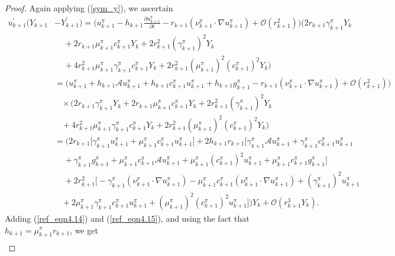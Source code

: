 \documentclass[10pt,a4paper]{amsart}
\begin{document}
\begin{proof}
Again applying (\ref{sym_y}), we ascertain
\begin{align}
u_{k+1}^{'}(Y_{k+1} &- Y_{k+1}^{'}) = \Big(u_{k+1}^{\pi} - h_{k+1}\frac{\partial u_{k+1}^{\pi}}{\partial t} - r_{k+1}(\nu_{k+1}^{\pi} \cdot\nabla u_{k+1}^{\pi}) + \mathcal{O}(r_{k+1}^{2})\Big) \Big( 2r_{k+1}\gamma_{k+1}^{\pi}Y_{k} \nonumber  \\  & 
\;\;\;\; + 2r_{k+1}\mu_{k+1}^{\pi}c^{\pi}_{k+1}Y_{k}  + 2r_{k+1}^{2}(\gamma_{k+1}^{\pi})^{2}Y_{k}  \nonumber  \\& \;\;\;\; + 4r_{k+1}^{2}\mu_{k+1}^{\pi}\gamma_{k+1}^{\pi} c_{k+1}^{\pi}Y_{k} + 2r_{k+1}^{2}(\mu_{k+1}^{\pi})^{2}(c_{k+1}^{\pi})^{2}Y_{k} \Big) \nonumber \\&  = 
\Big(u_{k+1}^{\pi} + h_{k+1} \mathcal{A}u_{k+1}^{\pi} + h_{k+1}c_{k+1}^{\pi}u_{k+1}^{\pi} + h_{k+1}g_{k+1}^{\pi} - r_{k+1}(\nu_{k+1}^{\pi} \cdot\nabla u_{k+1}^{\pi}) + \mathcal{O}(r_{k+1}^{2})\Big)
\nonumber \\  &   \;\;\; \times \Big( 2r_{k+1}\gamma_{k+1}^{\pi}Y_{k}  +2r_{k+1}\mu_{k+1}^{\pi}c_{k+1}^{\pi}Y_{k}   + 2r_{k+1}^{2}(\gamma_{k+1}^{\pi})^{2}Y_{k} \nonumber  \\& \;\;\; +  4r_{k+1}^{2}\mu_{k+1}^{\pi}\gamma_{k+1}^{\pi} c_{k+1}^{\pi}Y_{k} + 2r_{k+1}^{2}(\mu_{k+1}^{\pi})^{2}(c_{k+1}^{\pi})^{2}Y_{k} \Big) \nonumber \\
& = \Big( 2r_{k+1}\big[\gamma_{k+1}^{\pi}u_{k+1}^{\pi} + \mu^{\pi}_{k+1}c^{\pi}_{k+1}u^{\pi}_{k+1}\big] + 2 h_{k+1}r_{k+1}\big[\gamma_{k+1}^{\pi} \mathcal{A}u_{k+1}^{\pi} + \gamma_{k+1}^{\pi}c_{k+1}^{\pi}u_{k+1}^{\pi}  
\nonumber  \\ & \;\;\;\; + \gamma_{k+1}^{\pi}g_{k+1}^{\pi}   +\mu_{k+1}^{\pi}c_{k+1}^{\pi}\mathcal{A}u_{k+1}^{\pi}+\mu_{k+1}^{\pi}(c_{k+1}^{\pi})^{2}u_{k+1}^{\pi} 
+\mu_{k+1}^{\pi} c^{\pi}_{k+1} g_{k+1}^{\pi}\big] \nonumber 
\\  & \;\;\;\; 
+ 2r_{k+1}^{2}\big[ - \gamma_{k+1}^{\pi}(\nu_{k+1}^{\pi}\cdot \nabla  u_{k+1}^{\pi}) - \mu_{k+1}^{\pi}c_{k+1}^{\pi}(\nu_{k+1}^{\pi} \cdot \nabla u_{k+1}^{\pi}) +  (\gamma_{k+1}^{\pi})^{2}u_{k+1}^{\pi}  \nonumber  \\ & \;\;\;   + 2\mu_{k+1}^{\pi}\gamma_{k+1}^{\pi}c_{k+1}^{\pi} u_{k+1}^{\pi}  
 + (\mu_{k+1}^{\pi})^{2}(c_{k+1}^{\pi})^{2}u_{k+1}^{\pi}\big] \Big)Y_{k} + \mathcal{O}(r_{k+1}^{3}Y_{k}). \label{ref_eqn4.15}
\end{align}
Adding (\ref{ref_eqn4.14}) and (\ref{ref_eqn4.15}), and using the fact that $h_{k+1} = \mu_{k+1}^{\pi} r_{k+1}$, we get
\begin{align}

\end{align}
\end{proof}
\end{document}
